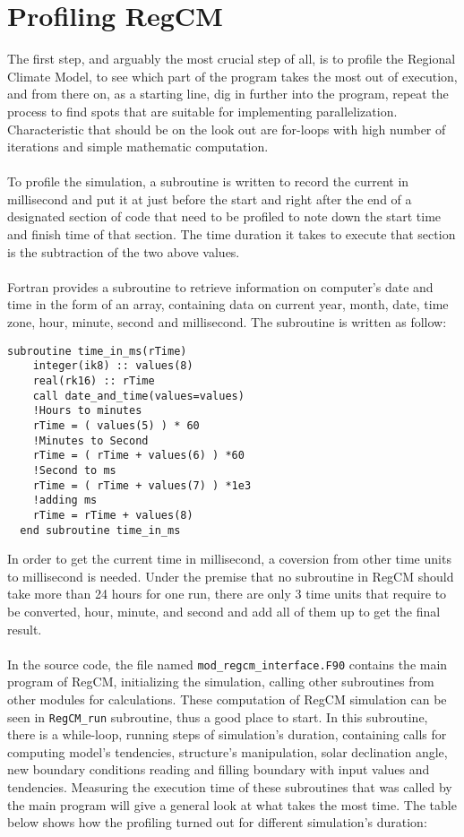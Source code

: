 \section{Profiling RegCM}
The first step, and arguably the most crucial step of all, is to profile the Regional Climate Model, to see which part of the program takes the most out of execution, and from there on, as a starting line, dig in further into the program, repeat the process to find spots that are suitable for implementing parallelization. Characteristic that should be on the look out are for-loops with high number of iterations and simple mathematic computation. \\
~\\
To profile the simulation, a subroutine is written to record the current in millisecond and put it at just before the start and right after the end of a designated section of code that need to be profiled to note down the start time and finish time of that section. The time duration it takes to execute that section is the subtraction of the two above values. \\
~\\
Fortran provides a subroutine to retrieve information on computer's date and time in the form of an array, containing data on current year, month, date, time zone, hour, minute, second and millisecond. The subroutine is written as follow:
\begin{center}
\begin{BVerbatim}
subroutine time_in_ms(rTime)
    integer(ik8) :: values(8)
    real(rk16) :: rTime
    call date_and_time(values=values)
    !Hours to minutes  
    rTime = ( values(5) ) * 60
    !Minutes to Second
    rTime = ( rTime + values(6) ) *60
    !Second to ms 
    rTime = ( rTime + values(7) ) *1e3
    !adding ms 
    rTime = rTime + values(8)
  end subroutine time_in_ms
\end{BVerbatim}
\end{center}
In order to get the current time in millisecond, a coversion from other time units to millisecond is needed. Under the premise that no subroutine in RegCM should take more than 24 hours for one run, there are only 3 time units that require to be converted, hour, minute, and second and add all of them up to get the final result.  \\
~\\
In the source code, the file named \verb|mod_regcm_interface.F90| contains the main program of RegCM, initializing the simulation, calling other subroutines from other modules for calculations. These computation of RegCM simulation can be seen in \verb|RegCM_run| subroutine, thus a good place to start. In this subroutine, there is a while-loop, running steps of simulation's duration, containing calls for computing model's tendencies, structure's manipulation, solar declination angle, new boundary conditions reading and filling boundary with input values and tendencies. Measuring the execution time of these subroutines that was called by the main program will give a general look at what takes the most time. The table below shows how the profiling turned out for different simulation's duration: \\
